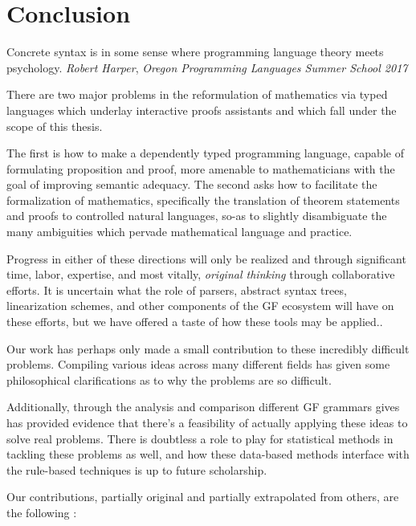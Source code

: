 \section{Conclusion}

\begin{displayquote}
Concrete syntax is in some sense where programming language theory meets
psychology. \emph{Robert Harper}, \emph{Oregon Programming Languages Summer School 2017}
\end{displayquote}

There are two major problems in the reformulation of mathematics via typed
languages which underlay interactive proofs assistants and which fall under the scope
of this thesis.

The first is how to make a dependently typed programming language, capable of
formulating proposition and proof, more amenable to mathematicians with the goal
of improving semantic adequacy. The second asks how to facilitate the
formalization of mathematics, specifically the translation of theorem statements
and proofs to controlled natural languages, so-as to slightly disambiguate the
many ambiguities which pervade mathematical language and practice.

Progress in either of these directions will only be realized and through
significant time, labor, expertise, and most vitally, \emph{original thinking}
through collaborative efforts. It is uncertain what the role of parsers,
abstract syntax trees, linearization schemes, and other components of the GF
ecosystem will have on these efforts, but we have offered a taste of how these
tools may be applied..

Our work has perhaps only made a small contribution to these incredibly
difficult problems. Compiling various ideas across many
different fields has given some philosophical clarifications as to why
the problems are so difficult.

Additionally, through the analysis and comparison different GF grammars gives
has provided evidence that there's a feasibility of actually applying these
ideas to solve real problems. There is doubtless a role to play for
statistical methods in tackling these problems as well, and how these data-based
methods interface with the rule-based techniques is up to future scholarship.

Our contributions, partially original and partially extrapolated from others,
are the following :


